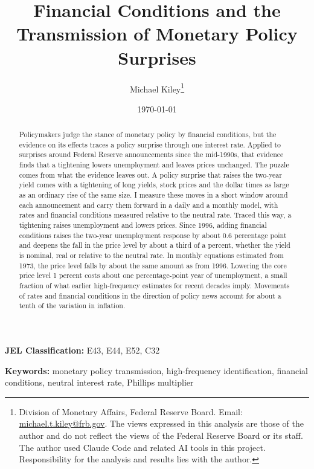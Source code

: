 \documentclass[11pt]{article}
\title{Financial Conditions and the Transmission of Monetary Policy Surprises}
\author{Michael Kiley\thanks{Division of Monetary Affairs, Federal Reserve Board. Email: \href{mailto:michael.t.kiley@frb.gov}{michael.t.kiley@frb.gov}. The views expressed in this analysis are those of the author and do not reflect the views of the Federal Reserve Board or its staff. The author used Claude Code and related AI tools in this project. Responsibility for the analysis and results lies with the author.}}
\date{\today}
\begin{document}
\maketitle

\begin{abstract}
Policymakers judge the stance of monetary policy by financial conditions, but the evidence on its effects traces a policy surprise through one interest rate. Applied to surprises around Federal Reserve announcements since the mid-1990s, that evidence finds that a tightening lowers unemployment and leaves prices unchanged. The puzzle comes from what the evidence leaves out. A policy surprise that raises the two-year yield comes with a tightening of long yields, stock prices and the dollar  times as large as an ordinary rise of the same size. I measure these moves in a short window around each announcement and carry them forward in a daily and a monthly model, with rates and financial conditions measured relative to the neutral rate. Traced this way, a tightening raises unemployment and lowers prices. Since 1996, adding financial conditions raises the two-year unemployment response by about 0.6 percentage point and deepens the fall in the price level by about a third of a percent, whether the yield is nominal, real or relative to the neutral rate. In monthly equations estimated from 1973, the price level falls by about the same amount as from 1996. Lowering the core price level 1 percent costs about one percentage-point year of unemployment, a small fraction of what earlier high-frequency estimates for recent decades imply. Movements of rates and financial conditions in the direction of policy news account for about a tenth of the variation in inflation.
\end{abstract}

\noindent\textbf{JEL Classification:} E43, E44, E52, C32

\noindent\textbf{Keywords:} monetary policy transmission, high-frequency identification, financial conditions, neutral interest rate, Phillips multiplier

\pagestyle{plain}

\newpage
{}

\end{document}

